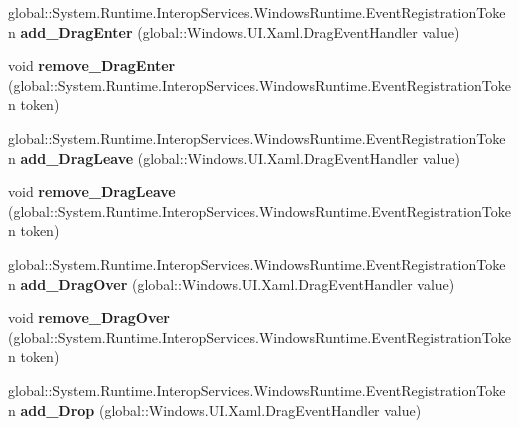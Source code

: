 \begin{DoxyCompactItemize}
global\+::\+System.\+Runtime.\+Interop\+Services.\+Windows\+Runtime.\+Event\+Registration\+Token {\bfseries add\+\_\+\+Drag\+Enter} (global\+::\+Windows.\+U\+I.\+Xaml.\+Drag\+Event\+Handler value)
\item 
\mbox{\label{interface_windows_1_1_u_i_1_1_xaml_1_1_i_u_i_element_a5a5960af1b1feea08a32346a9df72973}} 
void {\bfseries remove\+\_\+\+Drag\+Enter} (global\+::\+System.\+Runtime.\+Interop\+Services.\+Windows\+Runtime.\+Event\+Registration\+Token token)
\item 
\mbox{\label{interface_windows_1_1_u_i_1_1_xaml_1_1_i_u_i_element_ad7eb2baf580fcb2515afa4af987599d4}} 
global\+::\+System.\+Runtime.\+Interop\+Services.\+Windows\+Runtime.\+Event\+Registration\+Token {\bfseries add\+\_\+\+Drag\+Leave} (global\+::\+Windows.\+U\+I.\+Xaml.\+Drag\+Event\+Handler value)
\item 
\mbox{\label{interface_windows_1_1_u_i_1_1_xaml_1_1_i_u_i_element_ad457a93ec08cee7b4f4b038673af7df0}} 
void {\bfseries remove\+\_\+\+Drag\+Leave} (global\+::\+System.\+Runtime.\+Interop\+Services.\+Windows\+Runtime.\+Event\+Registration\+Token token)
\item 
\mbox{\label{interface_windows_1_1_u_i_1_1_xaml_1_1_i_u_i_element_a6deb1e61adbba0617ff0428e75ee83da}} 
global\+::\+System.\+Runtime.\+Interop\+Services.\+Windows\+Runtime.\+Event\+Registration\+Token {\bfseries add\+\_\+\+Drag\+Over} (global\+::\+Windows.\+U\+I.\+Xaml.\+Drag\+Event\+Handler value)
\item 
\mbox{\label{interface_windows_1_1_u_i_1_1_xaml_1_1_i_u_i_element_a3fe57bf41ebbf92eca2afbd6cf17c63f}} 
void {\bfseries remove\+\_\+\+Drag\+Over} (global\+::\+System.\+Runtime.\+Interop\+Services.\+Windows\+Runtime.\+Event\+Registration\+Token token)
\item 
\mbox{\label{interface_windows_1_1_u_i_1_1_xaml_1_1_i_u_i_element_a1aa925e3d35192dcae38b8299243b5f4}} 
global\+::\+System.\+Runtime.\+Interop\+Services.\+Windows\+Runtime.\+Event\+Registration\+Token {\bfseries add\+\_\+\+Drop} (global\+::\+Windows.\+U\+I.\+Xaml.\+Drag\+Event\+Handler value)

\end{DoxyCompactItemize}
